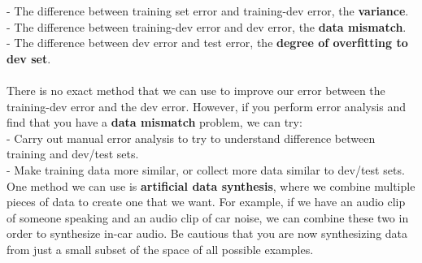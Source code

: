\documentclass[11pt, a4paper]{article}
\begin{document}
\begin{spacing}{1.1}
	\hspace*{3mm} - The difference between training set error and training-dev error, the \textbf{variance}. \\
	\hspace*{3mm} - The difference between training-dev error and dev error, the \textbf{data mismatch}. \\
	\hspace*{3mm} - The difference between dev error and test error, the \textbf{degree of overfitting to dev set}. \\~\\
	There is no exact method that we can use to improve our error between the training-dev error and the dev error. However, if you perform error analysis and find that you have a \textbf{data mismatch} problem, we can try: \\
	\hspace*{3mm} - Carry out manual error analysis to try to understand difference between training and dev/test sets.\\
	\hspace*{3mm} - Make training data more similar, or collect more data similar to dev/test sets. \vspace*{1.5mm} \\
	One method we can use is \textbf{artificial data synthesis}, where we combine multiple pieces of data to create one that we want. For example, if we have an audio clip of someone speaking and an audio clip of car noise, we can combine these two in order to synthesize in-car audio. Be cautious that you are now synthesizing data from just a small subset of the space of all possible examples. \newpage


\end{spacing}
\end{document}
